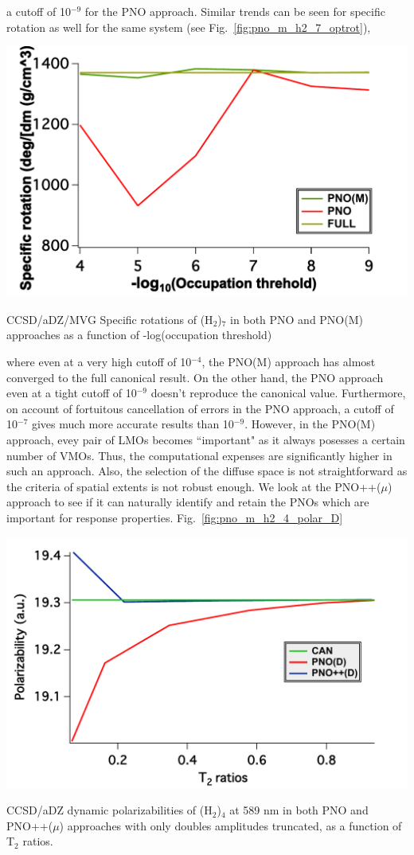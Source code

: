 a cutoff of 10$^{-9}$ for the PNO approach. Similar trends can be seen for specific rotation as well
for the same system (see Fig.~\ref{fig:pno_m_h2_7_optrot}),
\begin{MyFigure}[h!]
\centering
\includegraphics[width=0.6\linewidth,natwidth=610,natheight=642]{figures_pno++/pno_m_h2_7_adz_optrot.pdf}
\caption{{\footnotesize CCSD/aDZ/MVG Specific rotations of (H$_2$)$_7$ in both PNO and PNO(M) approaches
as a function of -log(occupation threshold)}}
\label{fig:pno_m_h2_7_optrot}
\end{MyFigure}
where even at a very high cutoff of 10$^{-4}$, the PNO(M) approach has almost converged to the full 
canonical result. On the other hand, the PNO approach even at a tight cutoff of 10$^{-9}$ doesn't
reproduce the canonical value. Furthermore, on account of fortuitous cancellation of errors in the
PNO approach, a cutoff of 10$^{-7}$ gives much more accurate results than 10$^{-9}$.
However, in the PNO(M) approach, evey pair of LMOs becomes ``important" as it always posesses 
a certain number of VMOs. Thus, the computational expenses are significantly higher in such an
approach. Also, the selection of the diffuse space is not straightforward as the criteria of 
spatial extents is not robust enough. We look at the PNO++($\mu$) approach to see if it can naturally
identify and retain the PNOs which are important for response properties.
Fig.~\ref{fig:pno_m_h2_4_polar_D}
\begin{MyFigure}[h!]
\centering
\includegraphics[width=0.6\linewidth,natwidth=610,natheight=642]{figures_pno++/h2_4_polar_D.pdf}
\caption{{\footnotesize CCSD/aDZ dynamic polarizabilities of (H$_2$)$_4$ at 589 nm in both PNO and PNO++($\mu$) approaches
with only doubles amplitudes truncated, as a function of T$_2$ ratios.}}
\label{fig:pno_m_h2_4_polar_D}
\end{MyFigure}
